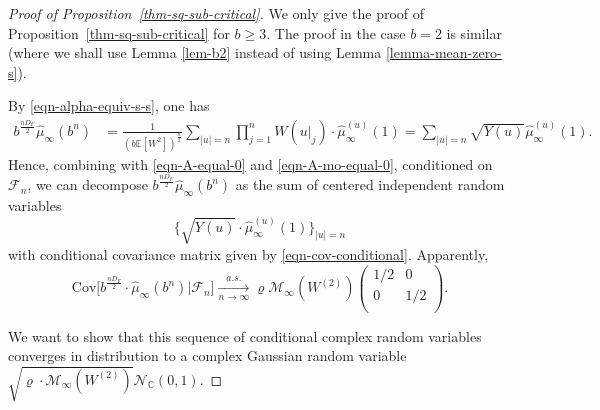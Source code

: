\documentclass[12pt]{amsart}
\theoremstyle{definition}
\theoremstyle{remark}
\newcommand{\C}{\mathbb{C}}
\newcommand{\E}{\mathbb{E}}
\newcommand{\VU}{Y(u)}
\numberwithin{equation}{section}
\begin{document}
\begin{proof}[Proof of Proposition~\ref{thm-sq-sub-critical}]
We only give the proof of Proposition~\ref{thm-sq-sub-critical} for $b \ge 3$.  The proof in the case $b =2$ is similar (where we shall use Lemma \ref{lem-b2} instead of using Lemma \ref{lemma-mean-zero-s}). 

By \eqref{eqn-alpha-equiv-s-s}, one has
\begin{align*}
 b^{\frac{n D_F}{2}} \widehat{\mu}_{\infty}(b^n)&=\frac{1}{(b\E[W^2])^{\frac{n}{2}}}\sum_{|u|=n}  \prod_{j=1}^{n} W(u|_j)  \cdot \widehat{\mu}_{\infty}^{(u)}(1)
=\sum_{|u|=n}\sqrt{\VU}\widehat{\mu}_{\infty}^{(u)}(1). 
\end{align*}
Hence, combining with \eqref{eqn-A-equal-0} and \eqref{eqn-A-mo-equal-0},  conditioned on $\mathscr{F}_n$,  we can decompose $b^{\frac{n D_F}{2}} \widehat{\mu}_{\infty}(b^n)$ as the sum of  centered independent random variables 
\[
 \big\{\sqrt{\VU}  \cdot \widehat{\mu}_{\infty}^{(u)}(1)\big\}_{|u|=n}
\]
with conditional covariance matrix given by \eqref{eqn-cov-conditional}. Apparently, 
\[
\mathrm{Cov}\Big[b^{\frac{n D_F}{2}}\cdot \widehat{\mu}_{\infty}(b^n)\big| \mathscr{F}_{n}\Big]\xrightarrow[n\to\infty]{a.s.}    \varrho \mathscr{M}_\infty(W^{(2)}) 
\begin{pmatrix}
1/2 &0\\
0&1/2 \\
\end{pmatrix}.
\]


We want to show that this sequence of conditional complex random variables converges in distribution to a  complex  Gaussian random variable  $\sqrt{\varrho\cdot \mathscr{M}_\infty(W^{(2)})}\mathcal{N}_{\C}(0,1)$.


\end{proof}
\end{document}
